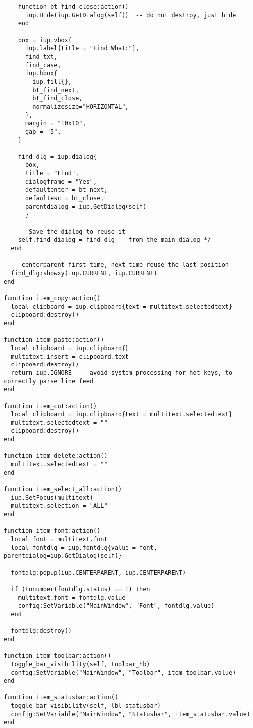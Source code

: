 \documentclass{ctexart}
\begin{document}
\begin{lstlisting}
    function bt_find_close:action()
      iup.Hide(iup.GetDialog(self))  -- do not destroy, just hide
    end

    box = iup.vbox{
      iup.label{title = "Find What:"},
      find_txt,
      find_case,
      iup.hbox{
        iup.fill{},
        bt_find_next,
        bt_find_close,
        normalizesize="HORIZONTAL", 
      },
      margin = "10x10", 
      gap = "5",
    }

    find_dlg = iup.dialog{
      box, 
      title = "Find", 
      dialogframe = "Yes", 
      defaultenter = bt_next, 
      defaultesc = bt_close,
      parentdialog = iup.GetDialog(self)
      }

    -- Save the dialog to reuse it 
    self.find_dialog = find_dlg -- from the main dialog */
  end

  -- centerparent first time, next time reuse the last position
  find_dlg:showxy(iup.CURRENT, iup.CURRENT)
end

function item_copy:action()
  local clipboard = iup.clipboard{text = multitext.selectedtext}
  clipboard:destroy()
end

function item_paste:action()
  local clipboard = iup.clipboard{}
  multitext.insert = clipboard.text
  clipboard:destroy()
  return iup.IGNORE  -- avoid system processing for hot keys, to correctly parse line feed
end

function item_cut:action()
  local clipboard = iup.clipboard{text = multitext.selectedtext}
  multitext.selectedtext = ""
  clipboard:destroy()
end

function item_delete:action()
  multitext.selectedtext = ""
end

function item_select_all:action()
  iup.SetFocus(multitext)
  multitext.selection = "ALL"
end

function item_font:action()
  local font = multitext.font
  local fontdlg = iup.fontdlg{value = font, parentdialog=iup.GetDialog(self)}

  fontdlg:popup(iup.CENTERPARENT, iup.CENTERPARENT)

  if (tonumber(fontdlg.status) == 1) then
    multitext.font = fontdlg.value
    config:SetVariable("MainWindow", "Font", fontdlg.value)
  end

  fontdlg:destroy()
end

function item_toolbar:action()
  toggle_bar_visibility(self, toolbar_hb)
  config:SetVariable("MainWindow", "Toolbar", item_toolbar.value)
end

function item_statusbar:action()
  toggle_bar_visibility(self, lbl_statusbar)
  config:SetVariable("MainWindow", "Statusbar", item_statusbar.value)
end


\end{lstlisting}
\end{document}
